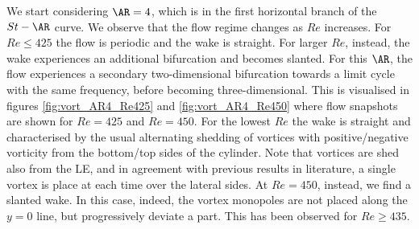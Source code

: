 We start considering $\AR=4$, which is in the first horizontal branch of the $St-\AR$ curve. We observe that the flow regime changes as $Re$ increases. For $Re \le 425$ the flow is periodic and the wake is straight. For larger $Re$, instead, the wake experiences an additional bifurcation and becomes slanted. For this $\AR$, the flow experiences a secondary two-dimensional bifurcation towards a limit cycle with the same frequency, before becoming three-dimensional. This is visualised in figures \ref{fig:vort_AR4_Re425} and \ref{fig:vort_AR4_Re450} where flow snapshots are shown for $Re=425$ and $Re=450$. For the lowest $Re$ the wake is straight and characterised by the usual alternating shedding of vortices with positive/negative vorticity from the bottom/top sides of the cylinder. Note that vortices are shed also from the LE, and in agreement with previous results in literature, a single vortex is place at each time over the lateral sides. At $Re=450$, instead, we find a slanted wake. In this case, indeed, the vortex monopoles are not placed along the $y=0$ line, but progressively deviate a part. This has been observed for $Re \ge 435$. 

